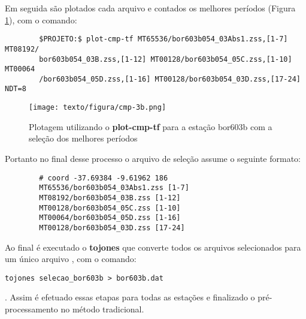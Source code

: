     \noindent Em seguida são plotados cada arquivo  e contados os melhores períodos (Figura \ref{plot-cmp-trad}), com o comando:
    
    \begin{footnotesize}        
\begin{verbatim}
        $PROJETO:$ plot-cmp-tf MT65536/bor603b054_03Abs1.zss,[1-7] MT08192/
        bor603b054_03B.zss,[1-12] MT00128/bor603b054_05C.zss,[1-10] MT00064
        /bor603b054_05D.zss,[1-16] MT00128/bor603b054_03D.zss,[17-24] NDT=8
\end{verbatim}
\end{footnotesize}
    
    \begin{figure}[H]
        \caption{Plotagem utilizando o  \textbf{plot-cmp-tf} para a estação bor603b com a seleção dos melhores períodos}
            \begin{center}
                \texttt{[image: texto/figura/cmp-3b.png]}
            \end{center}
        \legend{\Fonte{\oautor}}
        \label{plot-cmp-trad}
    \end{figure}
        
        Portanto no final desse processo o arquivo de seleção assume o seguinte formato:
        
        \begin{footnotesize}        
\begin{verbatim}
        # coord -37.69384 -9.61962 186
        MT65536/bor603b054_03Abs1.zss [1-7]
        MT08192/bor603b054_03B.zss [1-12]
        MT00128/bor603b054_05C.zss [1-10]
        MT00064/bor603b054_05D.zss [1-16]
        MT00128/bor603b054_03D.zss [17-24]
\end{verbatim}
\end{footnotesize}

        Ao final é executado o  \textbf{tojones} que converte todos os arquivos  selecionados para um único arquivo , com o comando: \begin{footnotesize}\verb|tojones selecao_bor603b > bor603b.dat|\end{footnotesize}.                                                                                                                                                                                                                      Assim é efetuado essas etapas para todas as estações e finalizado o pré-processamento no método tradicional.
        
